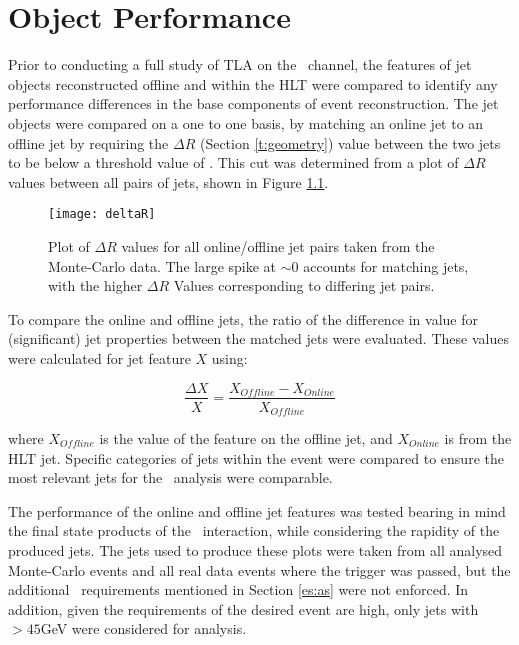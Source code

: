\chapter{Object Performance}\label{c:OP}

Prior to conducting a full study of TLA on the \VBFHBB\, channel, the features of jet objects reconstructed offline and within the HLT were compared to identify any performance differences in the base components of event reconstruction. The jet objects were compared on a one to one basis, by matching an online jet to an offline jet by requiring the $\Delta R$ (Section \ref{t:geometry}) value between the two jets to be below a threshold value of \DELTARTHRESHOLD. This cut was determined from a plot of $\Delta R$ values between all pairs of jets, shown in Figure \ref{f:deltaR}.

\begin{figure}[h]
	\centering
	\texttt{[image: deltaR]}
	\caption{Plot of $\Delta R$ values for all online/offline jet pairs taken from the Monte-Carlo data. The large spike at $\sim0$ accounts for matching jets, with the higher $\Delta R$ Values corresponding to differing jet pairs.}
	\label{f:deltaR}
\end{figure}
To compare the online and offline jets, the ratio of the difference in value for (significant) jet properties between the matched jets were evaluated. These values were calculated for jet feature $X$ using:

	\begin{equation}
	\frac{\Delta X}{X} = \frac{X_{Offline} - X_{Online}}{X_{Offline}}
	\end{equation}

	where $X_{Offline}$ is the value of the feature on the offline jet, and $X_{Online}$ is from the HLT jet. Specific categories of jets within the event were compared to ensure the most relevant jets for the \VBFHBB\, analysis were comparable.

	The performance of the online and offline jet features was tested bearing in mind the final state products of the \VBFHBB\, interaction, while considering the rapidity of the produced jets. The jets used to produce these plots were taken from all analysed Monte-Carlo events  and all real data events where the trigger was passed, but the additional \VBFHBB\, requirements mentioned in Section \ref{es:as} were not enforced. In addition, given the \pt requirements of the desired event are high, only jets with \pt$>45$GeV were considered for analysis.


